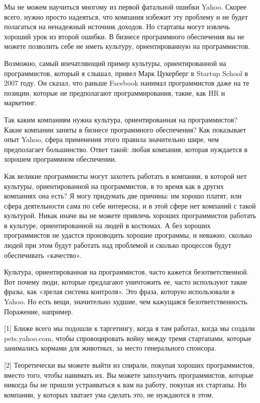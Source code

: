 \documentclass[ebook,12pt,oneside,openany]{memoir}
\begin{document}
Мы не можем научиться многому из первой фатальной ошибки Yahoo. Скорее
всего, нужно просто надеяться, что компания избежит эту проблему и не
будет полагаться на ненадежный источник доходов. Но стартапы могут
извлечь хороший урок из второй ошибки. В бизнесе программного
обеспечения вы не можете позволить себе не иметь культуру,
ориентированную на программистов.

Возможно, самый впечатляющий пример культуры, ориентированной на
программистов, который я слышал, привел Марк Цукерберг в Startup
School в 2007 году. Он сказал, что раньше Facebook нанимал
программистов даже на те позиции, которые не предполагают
программирования, такие, как HR и маркетинг.

Так каким компаниям нужна культура, ориентированная на программистов?
Какие компании заняты в бизнесе программного обеспечения? Как
показывает опыт Yahoo, сфера применения этого правила значительно
шире, чем предполагает большинство. Ответ такой: любая компания,
которая нуждается в хорошем программном обеспечении.

Как великие программисты могут захотеть работать в компании, в которой
нет культуры, ориентированной на программистов, в то время как в
других компаниях она есть? Я могу придумать две причины: им хорошо
платят, или сфера деятельности сама по себе интересна, и в этой сфере
нет компаний с такой культурой. Никак иначе вы не можете привлечь
хороших программистов работать в культуре, ориентированной на людей в
костюмах. А без хороших программистов не удастся производить хорошие
программы, и неважно, сколько людей при этом будут работать над
проблемой и сколько процессов будут обеспечивать «качество».

Культура, ориентированная на программистов, часто кажется
безответственной. Вот почему люди, которые предлагают уничтожить ее,
часто используют такие фразы, как «зрелая система контроля». Это
фраза, которую использовали в Yahoo. Но есть вещи, значительно худшие,
чем кажущаяся безответственность. Поражение, например.

[1] Ближе всего мы подошли к таргетингу, когда я там работал, когда мы
создали pets.yahoo.com, чтобы спровоцировать войну между тремя
стартапами, которые занимались кормами для животных, за место
генерального спонсора.

[2] Теоретически вы можете выйти из спирали, покупая хороших
программистов, вместо того, чтобы нанимать их. Вы можете заполучить
программистов, которые никогда бы не пришли устраиваться к вам на
работу, покупая их стартапы. Но компании, у которых хватает ума
сделать это, не нуждаются в этом.
\end{document}
